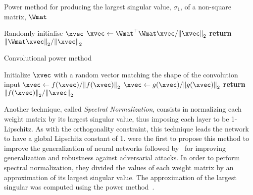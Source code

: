 \begin{algorithm}[tb]
  \caption{Power method for producing the largest singular value, $\sigma_1$, of a non-square matrix, $\Wmat$ \cite{gouk2018regularisation,golub2000eigenvalue}}
  \begin{algorithmic}[1]
    \State Randomly initialise $\xvec$
      \State $\xvec \gets \Wmat^\top \Wmat \xvec / \norm{\xvec}_2$
    \EndFor
    \State \textbf{return} $\norm{\Wmat \xvec}_2 / \norm{\xvec}_2$
  \end{algorithmic}
  \label{algorithm:ch3-power_method}
\end{algorithm}

\begin{algorithm}[tb]
  \caption{Convolutional power method \cite{farnia2018generalizable}}
  \begin{algorithmic}[1]
    \State Initialize $\xvec$ with a random vector matching the shape of the convolution input
      \State $\xvec \gets f(\xvec) / \norm{f(\xvec)}_2 $
      \State $\xvec \gets g(\xvec) / \norm{g(\xvec)}_2$
    \EndFor
    \State \textbf{return} $\norm{f(\xvec)}_2 / \norm{\xvec}_2$
  \end{algorithmic}
  \label{algorithm:ch3-power_method_generic}
\end{algorithm}


Another technique, called \emph{Spectral Normalization}, consists in normalizing each weight matrix by its largest singular value, thus imposing each layer to be 1-Lipschitz.
As with the orthogonality constraint, this technique leads the network to have a global Lipschitz constant of 1.
\citet{yoshida2017spectral} were the first to propose this method to improve the generalization of neural networks followed by~\cite{miyato2018spectral,gouk2018regularisation,farnia2018generalizable} for improving generalization and robustness against adversarial attacks.
In order to perform spectral normalization, they divided the values of each weight matrix by an approximation of its largest singular value.
The approximation of the largest singular was computed using the power method~\cite{golub2000eigenvalue}.

